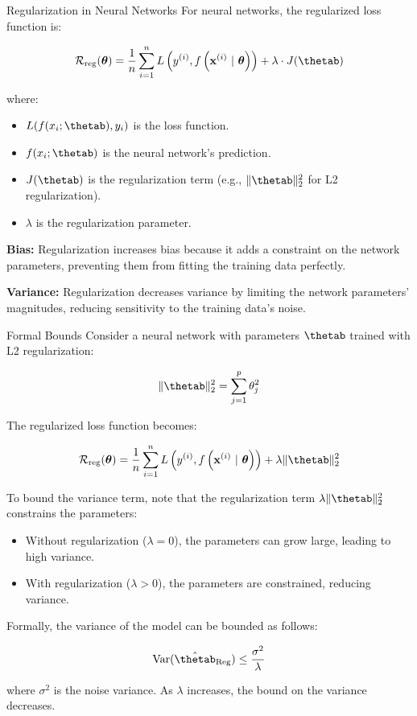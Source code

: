 \documentclass[11pt,compress,t,notes=noshow, xcolor=table]{beamer}
\begin{document}
\begin{vbframe}{Regularization in Neural Networks}
For neural networks, the regularized loss function is:

\[
\riskrt = \frac{1}{n} \sum_{i=1}^{n} \Lxyit + \lambda \cdot J(\thetab)
\]

where:

\begin{itemize}
    \item \( L(f(x_i; \thetab), y_i) \) is the loss function.
    \item \( f(x_i; \thetab) \) is the neural network's prediction.
    \item \( J(\thetab) \) is the regularization term (e.g., \( \|\thetab\|_2^2 \) for L2 regularization).
    \item \( \lambda \) is the regularization parameter.
\end{itemize}

\textbf{Bias:}
Regularization increases bias because it adds a constraint on the network parameters, preventing them from fitting the training data perfectly.

\textbf{Variance:}
Regularization decreases variance by limiting the network parameters' magnitudes, reducing sensitivity to the training data's noise.

\end{vbframe}

\begin{vbframe}{Formal Bounds}
Consider a neural network with parameters \(\thetab\) trained with L2 regularization:

\[
\|\thetab\|_2^2 = \sum_{j=1}^{p} \theta_j^2
\]

The regularized loss function becomes:

\[
\riskrt = \frac{1}{n} \sum_{i=1}^{n} \Lxyit + \lambda \|\thetab\|_2^2
\]

To bound the variance term, note that the regularization term \( \lambda \|\thetab\|_2^2 \) constrains the parameters:

\begin{itemize}
    \item Without regularization (\(\lambda = 0\)), the parameters can grow large, leading to high variance.
    \item With regularization (\(\lambda > 0\)), the parameters are constrained, reducing variance.
\end{itemize}

Formally, the variance of the model can be bounded as follows:

\[
\text{Var}(\hat{\thetab}_{\text{Reg}}) \leq \frac{\sigma^2}{\lambda}
\]

where \(\sigma^2\) is the noise variance. As \(\lambda\) increases, the bound on the variance decreases.
\end{vbframe}
\end{document}
